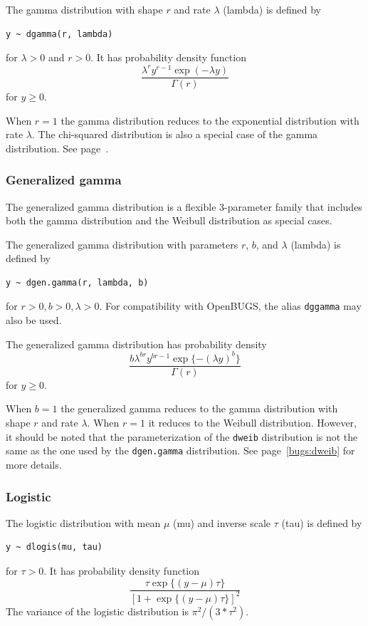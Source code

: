 \documentclass[11pt, a4paper, titlepage]{report}
\begin{document}
The gamma distribution with shape $r$ and rate $\lambda$ (lambda) is
defined by
\begin{verbatim}
y ~ dgamma(r, lambda)
\end{verbatim}
for $\lambda > 0$ and $r > 0$. It has probability density function
\[
\frac{\textstyle \lambda^r y^{r - 1} \exp(-\lambda y)}
     {\textstyle \Gamma(r)}
\]
for $y \geq 0$.

When $r=1$ the gamma distribution reduces to the exponential distribution
with rate $\lambda$. The chi-squared distribution is also a special case
of the gamma distribution. See page~\pageref{bugs:dchisqr}.

\subsubsection{Generalized gamma}      
\label{bugs:dgen.gamma}

The generalized gamma distribution is a flexible 3-parameter family
that includes both the gamma distribution and the Weibull distribution
as special cases.

The generalized gamma distribution with parameters $r$, $b$, and
$\lambda$ (lambda) is defined by
\begin{verbatim}
y ~ dgen.gamma(r, lambda, b)
\end{verbatim}
for $r > 0, b > 0, \lambda > 0$. For compatibility with OpenBUGS, the
alias \texttt{dggamma} may also be used.

The generalized gamma distribution has probability density
\[
\frac{\textstyle b \lambda^{b r} y^{b r - 1}  \exp\{-(\lambda y)^{b}\}}
     {\textstyle \Gamma(r)}
\]
for $y \geq 0$.

When $b=1$ the generalized gamma reduces to the gamma distribution
with shape $r$ and rate $\lambda$. When $r=1$ it reduces to the
Weibull distribution. However, it should be noted that the
parameterization of the \texttt{dweib} distribution is not the same as
the one used by the \texttt{dgen.gamma} distribution. See
page~\ref{bugs:dweib} for more details.

\subsubsection{Logistic}
\label{bugs:dlogis}

The logistic distribution with mean $\mu$ (mu) and inverse scale
$\tau$ (tau) is defined by
\begin{verbatim}
y ~ dlogis(mu, tau)
\end{verbatim}
for $\tau > 0$. It has probability density function
\[
\frac{\textstyle \tau \exp\{(y - \mu) \tau\}}
     {\textstyle  \left[1 + \exp\{(y - \mu) \tau\}\right]^2}
\]   
The variance of the logistic distribution is $\pi^2/(3*\tau^2)$.
\end{document}
